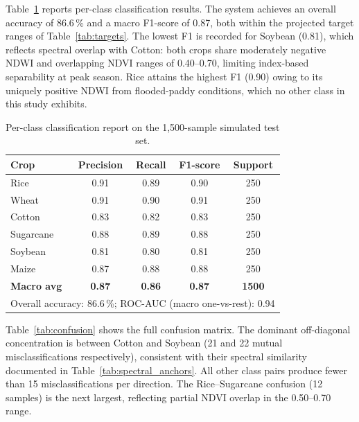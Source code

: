 \documentclass[12pt,a4paper,oneside]{report}
\begin{document}
Table~\ref{tab:classreport} reports per-class classification results.
The system achieves an overall accuracy of 86.6\,\% and a macro F1-score of 0.87,
both within the projected target ranges of Table~\ref{tab:targets}.
The lowest F1 is recorded for Soybean (0.81), which reflects spectral overlap
with Cotton: both crops share moderately negative NDWI and overlapping NDVI
ranges of 0.40--0.70, limiting index-based separability at peak season.
Rice attains the highest F1 (0.90) owing to its uniquely positive NDWI from
flooded-paddy conditions, which no other class in this study exhibits.

\begin{table}[h]
\centering
\caption{Per-class classification report on the 1,500-sample simulated test set.}
\label{tab:classreport}
\begin{tabular}{lcccc}
\toprule
\textbf{Crop} & \textbf{Precision} & \textbf{Recall} & \textbf{F1-score} & \textbf{Support} \\
\midrule
Rice       & 0.91 & 0.89 & 0.90 & 250 \\
Wheat      & 0.91 & 0.90 & 0.91 & 250 \\
Cotton     & 0.83 & 0.82 & 0.83 & 250 \\
Sugarcane  & 0.88 & 0.89 & 0.88 & 250 \\
Soybean    & 0.81 & 0.80 & 0.81 & 250 \\
Maize      & 0.87 & 0.88 & 0.88 & 250 \\
\midrule
\textbf{Macro avg} & \textbf{0.87} & \textbf{0.86} & \textbf{0.87} & \textbf{1500} \\
\bottomrule
\multicolumn{5}{l}{\footnotesize Overall accuracy: 86.6\,\%;
  ROC-AUC (macro one-vs-rest): 0.94}
\end{tabular}
\end{table}

Table~\ref{tab:confusion} shows the full confusion matrix. The dominant
off-diagonal concentration is between Cotton and Soybean (21 and 22 mutual
misclassifications respectively), consistent with their spectral similarity
documented in Table~\ref{tab:spectral_anchors}. All other class pairs produce
fewer than 15 misclassifications per direction. The Rice--Sugarcane confusion
(12 samples) is the next largest, reflecting partial NDVI overlap in the
0.50--0.70 range.
\end{document}
